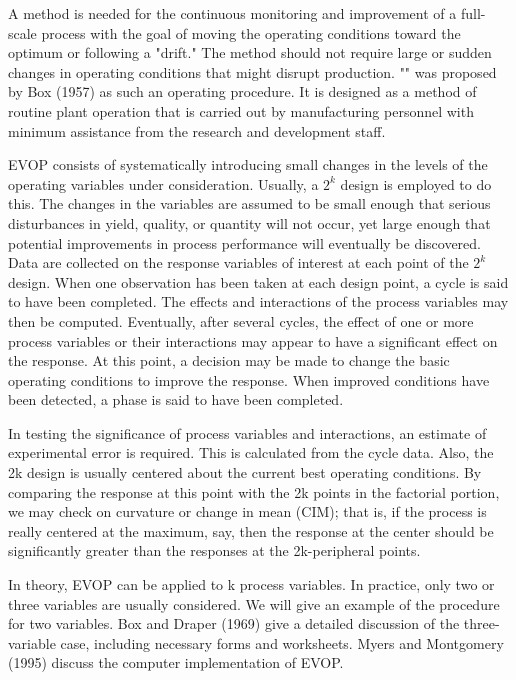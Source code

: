 	A method is needed for the continuous monitoring and improvement of a full-scale process with the goal of moving the operating conditions toward the optimum or following a "drift." The method should not require large or sudden changes in operating conditions that might disrupt production. "" was proposed by Box (1957) as such an operating procedure. It is designed as a method of routine plant operation that is carried out by manufacturing personnel with minimum assistance from the research and development staff.
	
	EVOP consists of systematically introducing small changes in the levels of the operating variables under consideration. Usually, a $2^k$ design is employed to do this. The changes in the variables are assumed to be small enough that serious disturbances in yield, quality, or quantity will not occur, yet large enough that potential improvements in process performance will eventually be discovered. Data are collected on the response variables of interest at each point of the $2^k$ design. When one observation has been taken at each design point, a cycle is said to have been completed. The effects and interactions of the process variables may then be computed. Eventually, after several cycles, the effect of one or more process variables or their interactions may appear to have a significant effect on the response. At this point, a decision may be made to change the basic operating conditions to improve the response. When improved conditions have been detected, a phase is said to have been completed. 
	
	In testing the significance of process variables and interactions, an estimate of experimental error is required. This is calculated from the cycle data. Also, the 2k design is usually centered about the current best operating conditions. By comparing the response at this point with the 2k points in the factorial portion, we may check on curvature or change in mean (CIM); that is, if the process is really centered at the maximum, say, then the response at the center should be significantly greater than the responses at the 2k-peripheral points.
	
	In theory, EVOP can be applied to k process variables. In practice, only two or three variables are usually considered. We will give an example of the procedure for two variables. Box and Draper (1969) give a detailed discussion of the three-variable case, including necessary forms and worksheets. Myers and Montgomery (1995) discuss the computer implementation of EVOP.
	
